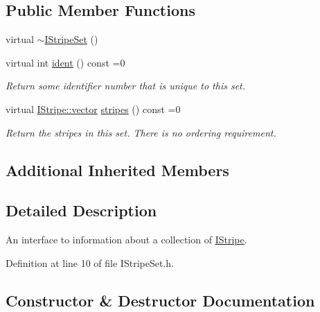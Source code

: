 \subsection*{Public Member Functions}
\begin{DoxyCompactItemize}
\item 
virtual \hyperlink{class_wire_cell_1_1_i_stripe_set_a0294b238f9bfaf04d4ae351878d1e660}{$\sim$\+I\+Stripe\+Set} ()
\item 
virtual int \hyperlink{class_wire_cell_1_1_i_stripe_set_ad0be5e0a3ec55c049289d7a6785d328b}{ident} () const =0
\begin{DoxyCompactList}\small\item\em Return some identifier number that is unique to this set. \end{DoxyCompactList}\item 
virtual \hyperlink{class_wire_cell_1_1_i_data_ae1a9f863380499bb43f39fabb6276660}{I\+Stripe\+::vector} \hyperlink{class_wire_cell_1_1_i_stripe_set_a45e9d5fa6b0f66a4da105b23ecf214ca}{stripes} () const =0
\begin{DoxyCompactList}\small\item\em Return the stripes in this set. There is no ordering requirement. \end{DoxyCompactList}\end{DoxyCompactItemize}
\subsection*{Additional Inherited Members}


\subsection{Detailed Description}
An interface to information about a collection of \hyperlink{class_wire_cell_1_1_i_stripe}{I\+Stripe}. 

Definition at line 10 of file I\+Stripe\+Set.\+h.



\subsection{Constructor \& Destructor Documentation}
\mbox{\label{class_wire_cell_1_1_i_stripe_set_a0294b238f9bfaf04d4ae351878d1e660}} 
